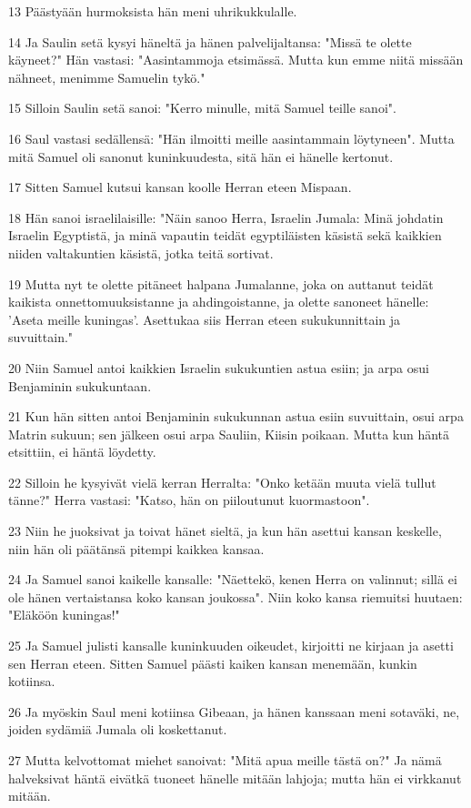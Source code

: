 \par 13 Päästyään hurmoksista hän meni uhrikukkulalle.
\par 14 Ja Saulin setä kysyi häneltä ja hänen palvelijaltansa: "Missä te olette käyneet?" Hän vastasi: "Aasintammoja etsimässä. Mutta kun emme niitä missään nähneet, menimme Samuelin tykö."
\par 15 Silloin Saulin setä sanoi: "Kerro minulle, mitä Samuel teille sanoi".
\par 16 Saul vastasi sedällensä: "Hän ilmoitti meille aasintammain löytyneen". Mutta mitä Samuel oli sanonut kuninkuudesta, sitä hän ei hänelle kertonut.
\par 17 Sitten Samuel kutsui kansan koolle Herran eteen Mispaan.
\par 18 Hän sanoi israelilaisille: "Näin sanoo Herra, Israelin Jumala: Minä johdatin Israelin Egyptistä, ja minä vapautin teidät egyptiläisten käsistä sekä kaikkien niiden valtakuntien käsistä, jotka teitä sortivat.
\par 19 Mutta nyt te olette pitäneet halpana Jumalanne, joka on auttanut teidät kaikista onnettomuuksistanne ja ahdingoistanne, ja olette sanoneet hänelle: 'Aseta meille kuningas'. Asettukaa siis Herran eteen sukukunnittain ja suvuittain."
\par 20 Niin Samuel antoi kaikkien Israelin sukukuntien astua esiin; ja arpa osui Benjaminin sukukuntaan.
\par 21 Kun hän sitten antoi Benjaminin sukukunnan astua esiin suvuittain, osui arpa Matrin sukuun; sen jälkeen osui arpa Sauliin, Kiisin poikaan. Mutta kun häntä etsittiin, ei häntä löydetty.
\par 22 Silloin he kysyivät vielä kerran Herralta: "Onko ketään muuta vielä tullut tänne?" Herra vastasi: "Katso, hän on piiloutunut kuormastoon".
\par 23 Niin he juoksivat ja toivat hänet sieltä, ja kun hän asettui kansan keskelle, niin hän oli päätänsä pitempi kaikkea kansaa.
\par 24 Ja Samuel sanoi kaikelle kansalle: "Näettekö, kenen Herra on valinnut; sillä ei ole hänen vertaistansa koko kansan joukossa". Niin koko kansa riemuitsi huutaen: "Eläköön kuningas!"
\par 25 Ja Samuel julisti kansalle kuninkuuden oikeudet, kirjoitti ne kirjaan ja asetti sen Herran eteen. Sitten Samuel päästi kaiken kansan menemään, kunkin kotiinsa.
\par 26 Ja myöskin Saul meni kotiinsa Gibeaan, ja hänen kanssaan meni sotaväki, ne, joiden sydämiä Jumala oli koskettanut.
\par 27 Mutta kelvottomat miehet sanoivat: "Mitä apua meille tästä on?" Ja nämä halveksivat häntä eivätkä tuoneet hänelle mitään lahjoja; mutta hän ei virkkanut mitään.

